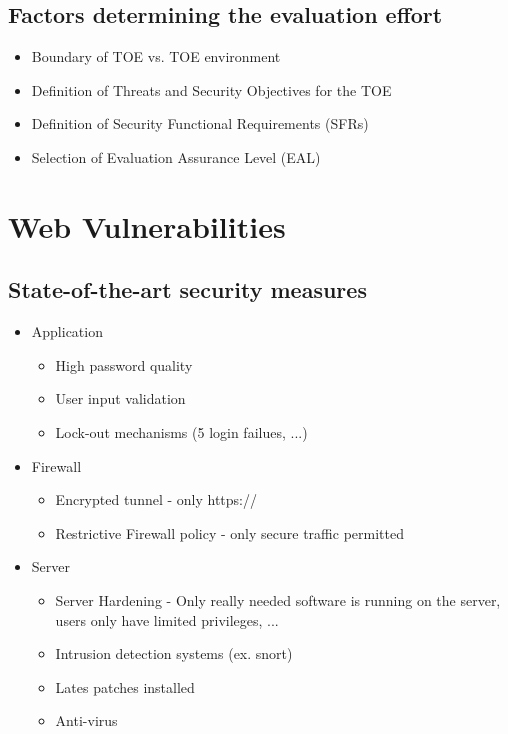 \documentclass[a4paper, 12pt]{article}
\begin{document}
		\subsection{Factors determining the evaluation effort}
			\begin{itemize}
				\item Boundary of TOE vs. TOE environment
				\item Definition of Threats and Security Objectives for the TOE
				\item Definition of Security Functional Requirements (SFRs)
				\item Selection of Evaluation Assurance Level (EAL)
			\end{itemize}
\section{Web Vulnerabilities}
\subsection{State-of-the-art security measures}
\begin{itemize}
	\item Application	
	\begin{itemize}
		\item High password quality
		\item User input validation
		\item Lock-out mechanisms (5 login failues, ...)
	\end{itemize}
	\item Firewall
	\begin{itemize}
		\item Encrypted tunnel - only https://
		\item Restrictive Firewall policy - only secure traffic permitted
	\end{itemize}
	\item Server
	\begin{itemize}
		\item Server Hardening - Only really needed software is running on the server, users only have limited privileges, ...
		\item Intrusion detection systems (ex. snort)
		\item Lates patches installed
		\item Anti-virus
	\end{itemize}
\end{itemize}
\end{document}
